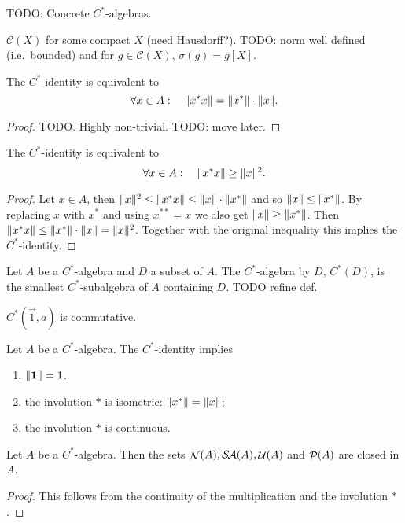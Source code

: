\begin{example}
TODO: Concrete $C^*$-algebras.

$\mathcal{C}(X)$ for some compact $X$ (need Hausdorff?). TODO: norm well defined (i.e.\ bounded) and for $g\in \mathcal{C}(X)$, $\sigma(g) = g[X]$.
\end{example}

\begin{proposition}
The $C^*$-identity is equivalent to
\[\forall x\in A: \quad \lVert x^*x\rVert = \lVert x^*\rVert\cdot\lVert x\rVert.\]
\end{proposition}
\begin{proof}
TODO. Highly non-trivial. TODO: move later.
\end{proof}


\begin{lemma} \label{C*identityEquivalent}
The $C^*$-identity is equivalent to
\[\forall x\in A: \quad \lVert x^*x\rVert \geq \lVert x\rVert^2.\]
\end{lemma}
\begin{proof}
Let $x\in A$, then $\lVert x\rVert^2 \leq \lVert x^*x\rVert \leq \lVert x\rVert\cdot\lVert x^*\rVert$ and so $\lVert x\rVert\leq \lVert x^*\rVert$. By replacing $x$ with $x^*$ and using $x^{**}=x$ we also get $\lVert x\rVert\geq \lVert x^*\rVert$. Then $\lVert x^*x\rVert\leq \lVert x^*\rVert\cdot\lVert x\rVert = \lVert x\rVert^2$. Together with the original inequality this implies the $C^*$-identity.
\end{proof}

\begin{definition}
Let $A$ be a $C^*$-algebra and $D$ a subset of $A$. The $C^*$-algebra  by $D$, $C^*(D)$, is the smallest $C^*$-subalgebra of $A$ containing $D$.
TODO refine def.
\end{definition}
\begin{lemma}
$C^*(\vec{1},a)$ is commutative.
\end{lemma}

\begin{lemma} \label{consequencesC*}
Let $A$ be a $C^*$-algebra. The $C^*$-identity implies
\begin{enumerate}
\item  $\lVert\boldsymbol{\mathrm{1}}\rVert = 1$.
\item the involution $*$ is isometric: $\lVert x^*\rVert = \lVert x\rVert$;
\item the involution $*$ is continuous.
\end{enumerate}
\end{lemma}

\begin{lemma}
Let $A$ be a $C^*$-algebra. Then the sets $\mathop{\mathcal{N}}\nolimits(A), \mathop{\mathcal{S}\hspace{-0.15em}\mathcal{A}}\nolimits(A), \mathop{\mathcal{U}}\nolimits(A)$ and $\mathop{\mathcal{P}}\nolimits(A)$ are closed in $A$. 
\end{lemma}
\begin{proof}
This follows from the continuity of the multiplication and the involution $*$.
\end{proof}

